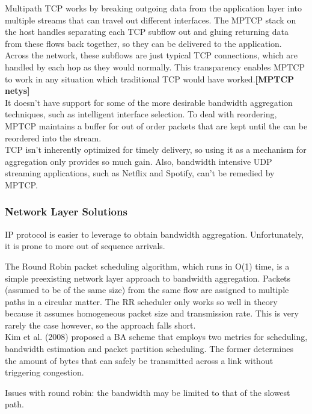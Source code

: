 \documentclass[12pt]{article}
\newcommand{\lcite}[1]
{{\bfseries\color{orange}[#1]}}
\begin{document}
		Multipath TCP works by breaking outgoing data from the application layer into multiple streams that can travel out different interfaces. The MPTCP stack on the host handles separating each TCP subflow out and gluing returning data from these flows back together, so they can be delivered to the application. Across the network, these subflows are just typical TCP connections, which are handled by each hop as they would normally. This transparency enables MPTCP to work in any situation which traditional TCP would have worked.\lcite{MPTCP netys}\\

		It doesn't have support for some of the more desirable bandwidth aggregation techniques, such as intelligent interface selection. To deal with reordering, MPTCP maintains a buffer for out of order packets that are kept until the can be reordered into the stream. \\

		TCP isn't inherently optimized for timely delivery, so using it as a mechanism for aggregation only provides so much gain. Also, bandwidth intensive UDP streaming applications, such as Netflix and Spotify, can't be remedied by MPTCP.

	\subsubsection{Network Layer Solutions}

		IP protocol is easier to leverage to obtain bandwidth aggregation. Unfortunately, it is prone to more out of sequence arrivals.

		The Round Robin packet scheduling algorithm, which runs in O(1) time, is a simple preexisting network layer approach to bandwidth aggregation. Packets (assumed to be of the same size) from the same flow are assigned to multiple paths in a circular matter. The RR scheduler only works so well in theory because it assumes homogeneous packet size and transmission rate. This is very rarely the case however, so the approach falls short.\\

		Kim et al. (2008) proposed a BA scheme that employs two metrics for scheduling, bandwidth estimation and packet partition scheduling. The former determines the amount of bytes that can safely be transmitted across a link without triggering congestion. 

		Issues with round robin: the bandwidth may be limited to that of the slowest path.
\end{document}
